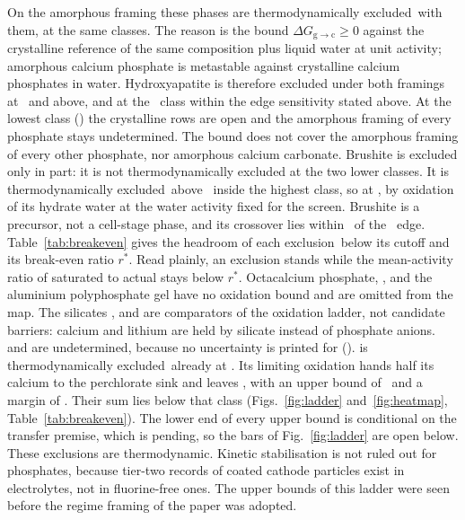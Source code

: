 On the amorphous framing these phases are thermodynamically excluded\nacreExcludedMark\ with them, at the same classes. %
The reason is the bound $\Delta G_{\mathrm{g}\to\mathrm{c}}\ge0$ against the crystalline reference of the same composition plus liquid water at unit activity; amorphous calcium phosphate is metastable against crystalline calcium phosphates in water. %
Hydroxyapatite is therefore excluded under both framings at \NumClassMidHigh\ and above, and at the \NumClassMidLow\ class within the edge sensitivity stated above. %
At the lowest class (\NumClassLo) the crystalline rows are open and the amorphous framing of every phosphate stays undetermined. %
The bound does not cover the amorphous framing of every other phosphate, nor amorphous calcium carbonate. %
Brushite is excluded only in part: it is not thermodynamically excluded at the two lower classes. %
It is thermodynamically excluded\nacreExcludedMark\nacreSinkMark\ above \NumRegCrossBrushiteHi\ inside the highest class, so at \NumClassHiHigh, by oxidation of its hydrate water at the water activity fixed for the screen. %
Brushite is a precursor, not a cell-stage phase, and its crossover lies within \NumEdgeTolerance\ of the \NumClassHiLow\ edge. %
Table~\ref{tab:breakeven} gives the headroom of each exclusion\nacreSinkMark\ below its cutoff and its break-even ratio $r^*$. %
Read plainly, an exclusion stands while the mean-activity ratio of saturated to actual  stays below $r^*$. %
Octacalcium phosphate, ,  and the aluminium polyphosphate gel have no oxidation bound and are omitted from the map. %
The silicates ,  and  are comparators of the oxidation ladder, not candidate barriers: calcium and lithium are held by silicate instead of phosphate anions. %
 and  are undetermined, because no uncertainty is printed for  (). %
 is thermodynamically excluded\nacreExcludedMark\nacreSinkMark\ already at \NumClassLo. %
Its limiting oxidation hands half its calcium to the perchlorate sink and leaves , with an upper bound of \NumBenCaSilOrthoROneSEub\ and a margin of \NumBenCaSilOrthoROneSMargin. %
Their sum lies below that class (Figs.~\ref{fig:ladder} and~\ref{fig:heatmap}, Table~\ref{tab:breakeven}). %
The lower end of every upper bound is conditional on the transfer premise, which is pending, so the bars of Fig.~\ref{fig:ladder} are open below. %
These exclusions are thermodynamic. %
Kinetic stabilisation is not ruled out for phosphates, because tier-two records of coated cathode particles exist in  electrolytes\cite{xiao2015unravelling,hofmann2020surface}, not in fluorine-free ones. %
The upper bounds of this ladder were seen before the regime framing of the paper was adopted. %

